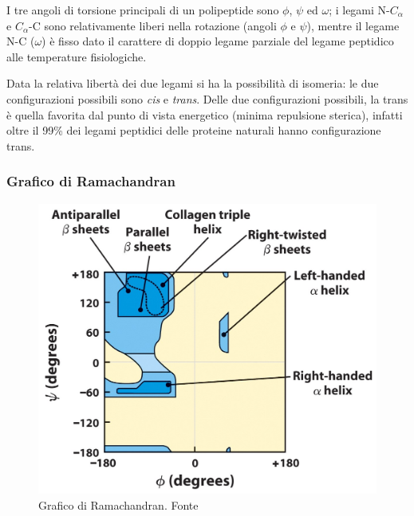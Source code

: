 {{{I tre angoli di torsione principali di un polipeptide sono $\phi$, $\psi$ ed $\omega$; i legami N-$C_{\alpha}$ e $C_{\alpha}$-C sono relativamente liberi nella rotazione (angoli $\phi$ e $\psi$), mentre il legame N-C ($\omega$) è fisso dato il carattere di doppio legame parziale del legame peptidico alle temperature fisiologiche.

\par Data la relativa libertà dei due legami si ha la possibilità di isomeria: le due configurazioni possibili sono \textit{cis } e \textit{trans}. Delle due configurazioni possibili, la trans è quella favorita dal punto di vista
energetico (minima repulsione sterica), infatti oltre il 99\% dei legami peptidici delle proteine naturali hanno configurazione trans.

\subsubsection{Grafico di Ramachandran}

\begin{figure}[!htb]
	\centering
	\includegraphics[scale=0.4]{images/Ramachandran's_Diagram.jpg}
	\caption{Grafico di Ramachandran. Fonte \cite{ramachandranDiag}}
	\label{fig:ramachandran}
\end{figure}

}}}
